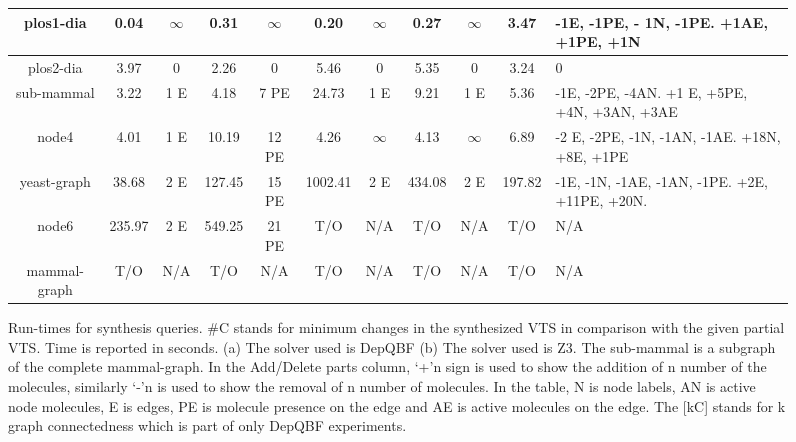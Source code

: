 \begin{sidewaysfigure}[t]
\begin{tabular}[t]{|c@{}|@{}c@{}|@{}c@{}|@{}c@{}|@{}c@{}|@{}c@{}|@{}c@{}|@{}c@{}|@{}c@{}|@{}c@{}|@{}C{4cm}@{}|}
		plos1-dia & 0.04&$\infty$& 0.31 &$\infty$& 0.20 & $\infty$ & 0.27&$\infty$& 3.47 & -1E, -1PE, - 1N, -1PE. +1AE, +1PE, +1N\\\hline
		plos2-dia & 3.97 & 0 &  2.26 & 0  & 5.46 & 0 & 5.35 & 0 & 3.24 & 0 \\\hline
		sub-mammal & 3.22 & 1 E  & 4.18 & 7 PE  & 24.73 & 1 E  & 9.21 & 1 E & 5.36  & -1E, -2PE, -4AN. +1 E, +5PE, +4N, +3AN, +3AE \\\hline
		node4  & 4.01  & 1 E  & 10.19  & 12 PE & 4.26  & $\infty$ & 4.13 &$\infty$&  6.89  & -2 E, -2PE, -1N, -1AN, -1AE. +18N, +8E, +1PE \\\hline
		yeast-graph & 38.68  & 2 E  &   127.45  & 15 PE   & 1002.41  & 2 E  & 434.08   & 2 E & 197.82  &  -1E, -1N, -1AE, -1AN, -1PE. +2E, +11PE, +20N. \\\hline
		node6  &  235.97  & 2 E  &  549.25    & 21 PE    &  T/O  & N/A      &  T/O   &  N/A   &  T/O     & N/A \\\hline
		mammal-graph   &  T/O     & N/A  &  T/O    & N/A    &  T/O  & N/A      &  T/O   &  N/A   &  T/O     & N/A\\\hline
	\end{tabular}
	\caption{Run-times for synthesis queries. \#C stands for minimum changes in the synthesized VTS in comparison with the given partial VTS. Time is reported in seconds. (a) The solver used is DepQBF (b) The solver used is Z3. The sub-mammal is a subgraph of the complete mammal-graph. In the Add/Delete parts column, ‘+’n sign is used to show the addition of n number of the molecules, similarly ‘-’n is used to show the removal of n number of molecules. In the table, N is node labels, AN is active node molecules, E is edges, PE is molecule presence on the edge and AE is active molecules on the edge. The [kC] stands for k graph connectedness which is part of only DepQBF experiments.}
	
	\label{tab:synth-graph}
\end{sidewaysfigure}

